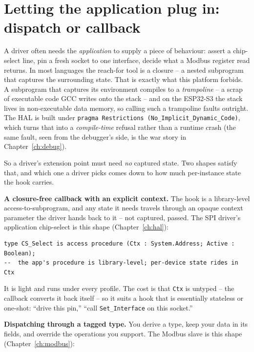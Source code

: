 \section{Letting the application plug in: dispatch or callback}
\label{driver:plugin}

A driver often needs the \emph{application} to supply a piece of behaviour: assert
a chip-select line, pin a fresh socket to one interface, decide what a Modbus
register read returns. In most languages the reach-for tool is a closure -- a
nested subprogram that captures the surrounding state. That is exactly what this
platform forbids. A subprogram that captures its environment compiles to a
\emph{trampoline} -- a scrap of executable code GCC writes onto the stack -- and on
the ESP32-S3 the stack lives in non-executable data memory, so calling such a
trampoline faults outright. The HAL is built under
\texttt{pragma Restrictions (No\_Implicit\_Dynamic\_Code)}, which turns that into a
\emph{compile-time} refusal rather than a runtime crash (the same fault, seen from
the debugger's side, is the war story in Chapter~\ref{ch:debug}).

So a driver's extension point must need \emph{no} captured state. Two shapes
satisfy that, and which one a driver picks comes down to how much per-instance
state the hook carries.

\textbf{A closure-free callback with an explicit context.} The hook is a
library-level access-to-subprogram, and any state it needs travels through an
opaque context parameter the driver hands back to it -- not captured, passed. The
SPI driver's application chip-select is this shape (Chapter~\ref{ch:hal}):

\begin{lstlisting}
type CS_Select is access procedure (Ctx : System.Address; Active : Boolean);
--  the app's procedure is library-level; per-device state rides in Ctx
\end{lstlisting}

It is light and runs under every profile. The cost is that \texttt{Ctx} is
untyped -- the callback converts it back itself -- so it suits a hook that is
essentially stateless or one-shot: ``drive this pin,'' ``call \texttt{Set\_Interface}
on this socket.''

\textbf{Dispatching through a tagged type.} You derive a type, keep your data in
its fields, and override the operations you support. The Modbus slave is this
shape (Chapter~\ref{ch:modbus}):


